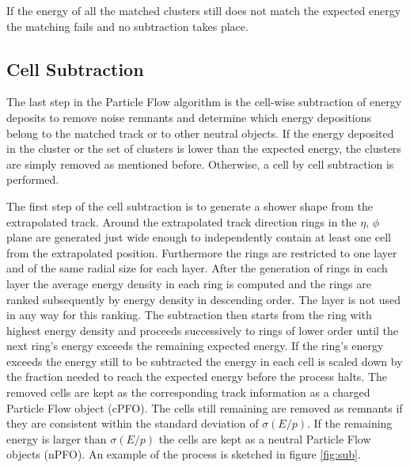 If the energy of all the matched clusters still does not match the expected energy the matching fails and no subtraction takes place.

\subsection{Cell Subtraction}

The last step in the Particle Flow algorithm is the cell-wise subtraction of energy deposits to remove noise remnants and determine which energy depositions belong to the matched track or to other neutral objects.
If the energy deposited in the cluster or the set of clusters is lower than the expected energy, the clusters are simply removed as mentioned before. Otherwise, a cell by cell subtraction is performed.

The first step of the cell subtraction is to generate a shower shape from the extrapolated track. Around the extrapolated track direction rings in the $\eta$, $\phi$ plane are generated just wide enough to independently contain at least one cell from the extrapolated position. Furthermore the rings are restricted to one layer and of the same radial size for each layer.
After the generation of rings in each layer the average energy density in each ring is computed and the rings are ranked subsequently by energy density in descending order. The layer is not used in any way for this ranking.
The subtraction then starts from the ring with highest energy density and proceeds successively to rings of lower order until the next ring's energy exceeds the remaining expected energy.
If the ring's energy exceeds the energy still to be subtracted the energy in each cell is scaled down by the fraction needed to reach the expected energy before the process halts. The removed cells are kept as the corresponding track information as a charged Particle Flow object (cPFO). The cells still remaining are removed as remnants if they are consistent within the standard deviation of $\sigma (E/p)$. If the remaining energy is larger than $\sigma (E/p)$ the cells are kept as a neutral Particle Flow objects (nPFO).
An example of the process is sketched in figure \ref{fig:sub}. 




